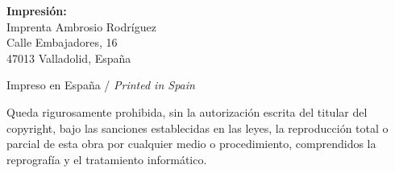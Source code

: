 \documentclass[12pt]{article}
\begin{document}
\begin{small}
\vspace{1cm}

\noindent \textbf{Impresión:} \\
Imprenta Ambrosio Rodríguez \\
Calle Embajadores, 16 \\
47013 Valladolid, España

\vspace{0.6cm}

\noindent Impreso en España / \textit{Printed in Spain}

\vspace{1cm}
\sloppy %
\noindent Queda rigurosamente prohibida, sin la autorización escrita del titular del copyright, bajo las sanciones establecidas en las leyes, la reproducción total o parcial de esta obra por cualquier medio o procedimiento, comprendidos la reprografía y el tratamiento informático.
\end{small}
\end{document}
